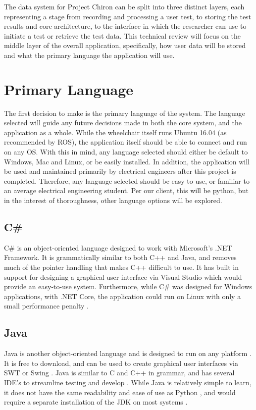 \documentclass[onecolumn, draftclsnofoot,10pt, compsoc]{report}
\begin{document}
The data system for Project Chiron can be split into three distinct layers, each representing a stage from recording and processing a user test, to storing the test results and core architecture, to the interface in which the researcher can use to initiate a test or retrieve the test data. This technical review will focus on the middle layer of the overall application, specifically, how user data will be stored and what the primary language the application will use.


\section{Primary Language}
The first decision to make is the primary language of the system. The language selected will guide any future decisions made in both the core system, and the application as a whole. While the wheelchair itself runs Ubuntu 16.04 (as recommended by ROS\cite{ROSKenetic}), the application itself should be able to connect and run on any OS. With this in mind, any language selected should either be default to Windows, Mac and Linux, or be easily installed. In addition, the application will be used and maintained primarily by electrical engineers after this project is completed. Therefore, any language selected should be easy to use, or familiar to an average electrical engineering student. Per our client, this will be python, but in the interest of thoroughness, other language options will be explored.
\subsection{C\#}
C\# is an object-oriented language designed to work with Microsoft's .NET Framework. It is grammatically similar to both C++ and Java, and removes much of the pointer handling that makes C++ difficult to use\cite{MicrosoftCSharp}. It has built in support for designing a graphical user interface via Visual Studio \cite{CSharpGraphics} which would provide an easy-to-use system. Furthermore, while C\# was designed for Windows applications, with .NET Core, the application could run on Linux with only a small performance penalty \cite{CSharpLinux}. 
\subsection{Java}
Java is another object-oriented language and is designed to run on any platform \cite{WhatIsJava}. It is free to download, and can be used to create graphical user interfaces via SWT or Swing \cite{JavaGraphics}. Java is similar to C and C++ in grammar, and has several IDE's to streamline testing and develop \cite{JavaIDE}. While Java is relatively simple to learn, it does not have the same readability and ease of use as Python \cite{JavaVPython}, and would require a separate installation of the JDK on most systems \cite{JavaGettingStarted}.
\end{document}
